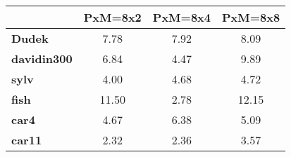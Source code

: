 \begin{tabular}{|l|c|c|c|}
\hline
&\textbf{PxM=8x2}&\textbf{PxM=8x4}&\textbf{PxM=8x8}\\\hline
\textbf{Dudek}&7.78&7.92&8.09\\\hline
\textbf{davidin300}&6.84&4.47&9.89\\\hline
\textbf{sylv}&4.00&4.68&4.72\\\hline
\textbf{fish}&11.50&2.78&12.15\\\hline
\textbf{car4}&4.67&6.38&5.09\\\hline
\textbf{car11}&2.32&2.36&3.57\\\hline
\end{tabular}
